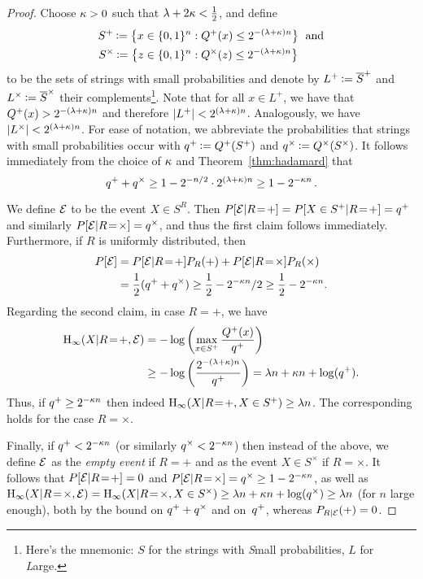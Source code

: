 \begin{proof}
Choose $\sp > 0$ such that $\lambda + 2 \sp < \frac12$, and 
define
\begin{align*}
S^+ \assign \big\{ x \in \nbit &: \Qp(x) \leq  2^{-(\lambda + \sp )n}
\big\}\; \mbox{ and}\\
S^{\times} \assign \big\{ z \in \nbit &: \Qt(z) \leq  2^{-(\lambda
  +\sp )n} \big\}
\end{align*} 
to be the sets of strings with small probabilities and denote by $L^+
\assign \ol{S}^+$ and $L^{\times} \assign \ol{S}^{\times}$ their
complements\footnote{Here's the mnemonic: $S$ for the strings with
  \emph{S}mall probabilities, $L$ for \emph{L}arge.}. Note that for
all $x \in L^+$, we have that $\Qp(x) > 2^{-(\lambda + \sp )n}$ and
therefore $|L^+| < 2^{(\lambda + \sp)n}$. Analogously, we have
$|L^{\times}| < 2^{(\lambda + \sp)n}$. For ease of notation, we
abbreviate the probabilities that strings with small probabilities
occur with $\qp \assign \Qp(S^+)$ and $\qt \assign \Qt(S^{\times})$.
It follows immediately from the choice of $\sp$ and
Theorem~\ref{thm:hadamard} that $$\qp+\qt \geq 1 - 2^{-n/2} \cdot
2^{(\lambda + \sp)n} \geq 1- 2^{-\sp n} \, .$$

We define $\ev$ to be the event $X \in S^R$.  Then $\P[\ev|R\!=\!+]
= \P[X\in S^+|R\!=\!+] = \qp$ and similarly $\P[\ev|R\!=\!\times] =
\qt$, and thus the first claim follows immediately. Furthermore, if
$R$ is uniformly distributed, then
\begin{align*}
\P[\ev] &= \P[\ev|R\!=\!+] P_R(+) + \P[\ev|R\!=\!\times] P_R(\times)\\
 &= \frac{1}{2} (\qp + \qt) \geq \frac{1}{2} - 2^{-\sp n}/2 \geq
 \frac{1}{2} - 2^{-\sp n}.
\end{align*}
Regarding the second claim, in case $R=+$, we have
\begin{align*}
  \H_{\infty}(X|R\!=\!+, \ev) 
&= -\log\left(\max_{x \in S^+} \frac{\Qp(x)}{\qp}\right) \nonumber\\
  &\geq -\log\left(\frac{2^{-(\lambda + \sp)n}}{\qp}\right) = \lambda
  n + \sp n + \log(\qp). %
\end{align*}
Thus, if $\qp \geq 2^{-\sp n}$ then indeed $\H_{\infty}(X|R\!=\!+, X
\in S^+) \geq \lambda n$. The corresponding holds for the case $R =
\times$.

Finally, if $\qp < 2^{-\sp n}$ (or similarly \mbox{$\qt < 2^{-\sp
    n}$}) then instead of the above, we define $\ev$ as the {\em
  empty event} if $R = +$ and as the event $X \in S^{\times}$ if $R =
\times$. It follows that $\P[\ev|R\!=\!+] = 0$ and
$\P[\ev|R\!=\!\times] = \qt \geq 1 - 2^{-\sp n}$, as well as
$\H_{\infty}(X|R\!=\!\times, \ev) = \H_{\infty}(X|R\!=\!\times, X \in
S^{\times}) \geq \lambda n + \sp n + \log(\qt) \geq \lambda n$ (for
$n$ large enough), both by the bound on $\qp+\qt$ and on~$\qp$,
whereas $P_{R | \ev}(+) = 0$.
\end{proof}

